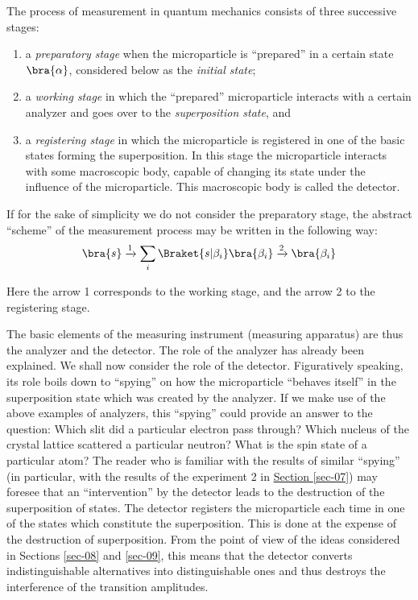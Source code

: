 \documentclass[a4paper,sfsidenotes,colorlinks=true]{tufte-book}
\numberwithin{equation}{section}
\numberwithin{figure}{section}
\begin{document}
The process of
measurement in quantum mechanics consists of three successive stages:
\begin{enumerate}[label=(\arabic*), leftmargin=1cm]
\item  a \emph{preparatory stage} when the microparticle is ``prepared'' in a
certain state $\bra{\alpha}$, considered below as the \emph{initial state}; 
\item a \emph{working stage} in which the ``prepared'' microparticle
  interacts with a certain analyzer and goes over to the \emph{superposition
  state}, and
\item a \emph{registering stage} in which the microparticle is registered in
  one of the basic states forming the superposition. In this stage
  the microparticle interacts with some macroscopic body, capable of
  changing its state under the influence of the microparticle. This
  macroscopic body is called the detector.
\end{enumerate}


If for the sake of simplicity we do not consider the preparatory stage, the abstract ``scheme'' of the measurement process may be written in the following way:
\begin{equation}%
\bra{s} \xrightarrow{1} \sum_{i} \Braket{s|\beta_{i}} \bra{\beta_{i}} \xrightarrow{2} \bra{\beta_{i}}
\label{eq-11.5}
\end{equation}

Here the arrow 1 corresponds to the working stage, and the arrow 2 to
the registering stage. 


The basic elements of the measuring instrument (measuring apparatus)
are thus the analyzer and the detector. The role of the analyzer has
already been explained. We shall now consider the role of the
detector. Figuratively speaking, its role boils down to ``spying'' on
how the microparticle ``behaves itself'' in the superposition state
which was created by the analyzer. If we make use of the above
examples of analyzers, this ``spying'' could provide an answer to the
question: Which slit did a particular electron pass through? Which
nucleus of the crystal lattice scattered a particular neutron? What is
the spin state of a particular atom? The reader who is familiar with
the results of similar ``spying'' (in particular, with the results of
the experiment 2 in \hyperref[sec-07]{Section \ref{sec-07}}) may
foresee that an ``intervention'' by the detector leads to the
destruction of the superposition of states. The detector registers the
microparticle each time in one of the states which constitute the
superposition. This is done at the expense of the destruction of
superposition. From the point of view of the ideas considered in
Sections \ref{sec-08} and \ref{sec-09}, this means that the detector
converts indistinguishable alternatives into distinguishable ones
and thus destroys the interference of the transition amplitudes.
\end{document}
